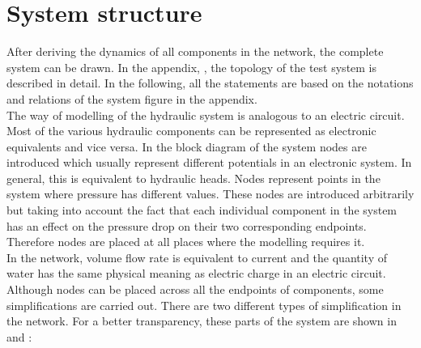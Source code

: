 \section{System structure}  
\label{SystemModel}

After deriving the dynamics of all components in the network, the complete system can be drawn. In the appendix, , the topology of the test system is described in detail. In the following, all the statements are based on the notations and relations of the system figure in the appendix. 
\\
The way of modelling of the hydraulic system is analogous to an electric circuit. Most of the various hydraulic components can be represented as electronic equivalents and vice versa. In the block diagram of the system nodes are introduced which usually represent different potentials in an electronic system. In general, this is equivalent to hydraulic heads. Nodes represent points in the system where pressure has different values. These nodes are introduced arbitrarily but taking into account the fact that each individual component in the system has an effect on the pressure drop on their two corresponding endpoints. Therefore nodes are placed at all places where the modelling requires it. 
\\
In the network, volume flow rate is equivalent to current and the quantity of water has the same physical meaning as electric charge in an electric circuit. 
\\ 
Although nodes can be placed across all the endpoints of components, some simplifications are carried out. There are two different types of simplification in the network. For a better transparency, these parts of the system are shown in  and : 


\begin{figure}[H]
\centering
\begin{minipage}{0.2\textwidth}
  \centering
   
  \label{fig:subsys_1}
\end{minipage}%
\begin{minipage}{0.2\textwidth}
  \centering
   
  \label{fig:subsys_2}
\end{minipage}
\end{figure}


